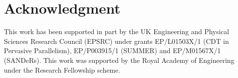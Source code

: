\documentclass[sigplan,10pt,screen]{acmart}%
\begin{document}
\author{Rodrigo Rocha}

\author{Pavlos Petoumenos}

\author{Zheng Wang}

\author{Murray Cole}

\author{Hugh Leather}





\maketitle














%


\section*{Acknowledgment}
This work has been supported in part by the UK Engineering and Physical Sciences Research Council (EPSRC) under grants EP/L01503X/1 (CDT in
Pervasive Parallelism), EP/P003915/1 (SUMMER) and EP/M01567X/1 (SANDeRs).  This work was supported by the Royal Academy of Engineering
under the Research Fellowship scheme.


%

%





\balance



%
\end{document}

